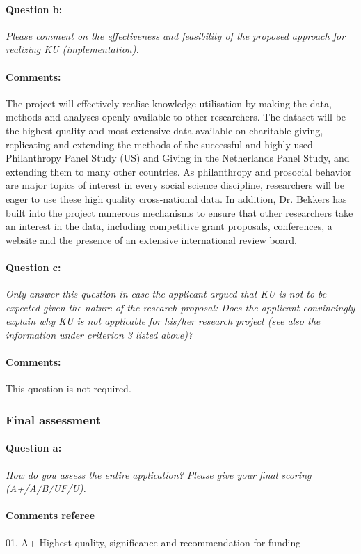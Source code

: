 \documentclass[twocolumn, serif, rga, numeric]{jote-article}
\begin{document}
\paragraph{Question b:}
\textit{Please comment on the effectiveness and feasibility of the proposed approach for realizing KU (implementation).}
\paragraph{Comments:}
The project will effectively realise knowledge utilisation by making the data, methods and analyses openly available to other researchers. The dataset will be the highest quality and most extensive data available on charitable giving, replicating and extending the methods of the successful and highly used Philanthropy Panel Study (US) and Giving in the Netherlands Panel Study, and extending them to many other countries. As philanthropy and prosocial behavior are major topics of interest in every social science discipline, researchers will be eager to use these high quality cross-national data. In addition, Dr. Bekkers has built into the project numerous mechanisms to ensure that other researchers take an interest in the data, including competitive grant proposals, conferences, a website and the presence of an extensive international review board.
\paragraph{Question c:}
\textit{Only answer this question in case the applicant argued that KU is not to be expected given the nature of the research proposal: Does the applicant convincingly explain why KU is not applicable for his/her research project (see also the information under criterion 3 listed above)?}
\paragraph{Comments:}
This question is not required.
 {}\subsubsection*{Final assessment} 
\paragraph{Question a:}
\textit{How do you assess the entire application? Please give your final scoring (A+/A/B/UF/U).}
\paragraph{Comments referee} 
01, A+ Highest quality, significance and recommendation for funding
\end{document}
